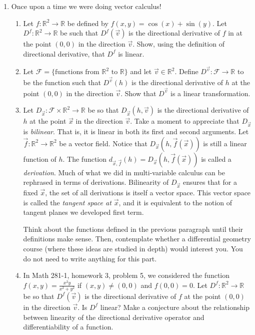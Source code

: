 \documentclass[letter]{article}
\newcommand{\R}{\mathbb{R}}
\begin{document}
\begin{enumerate}
		\item {\sc Once upon a time we were doing vector calculus!}
			\begin{enumerate}
				\item Let $f:\R^2\to \R$ be defined by $f(x,y) = \cos(x)+\sin(y)$.  Let $D^f:\R^2\to\R$
					be such that $D^f(\vec v)$ is the directional derivative of $f$ in at the point $(0,0)$
					in the direction $\vec v$.  Show, using the definition of directional derivative, that
					$D^f$ is linear.
				\item Let $\mathcal F=\{\text{functions from $\R^2$ to $\R$}\}$ and let $\vec v\in \R^2$.
					Define $D^{\vec v}:\mathcal F\to \R$ to be the function such that $D^{\vec v}(h)$
					is the directional derivative of $h$ at the point $(0,0)$ in the direction $\vec v$.
					Show that $D^{\vec v}$ is a linear transformation.
				\item Let $D_{\vec x}:\mathcal F\times \R^2\to\R$ be so that $D_{\vec x}(h,\vec v)$ is the directional
					derivative of $h$ at the point $\vec x$ in the direction $\vec v$.
					Take a moment to appreciate that $D_{\vec x}$ is \emph{bilinear}.  That is, it is
					linear in both its first and second arguments.  Let $\vec f:\R^2\to\R^2$ be a 
					vector field.  Notice that $D_{\vec x}(h,\vec f(\vec x))$ is still a linear function of
					$h$.  The function $d_{\vec x,\vec f}(h)=D_{\vec x}(h, \vec f(\vec x))$ is called
					a \emph{derivation}.  Much of what we did in multi-variable calculus can be rephrased
					in terms of derivations.    Bilinearity of $D_{\vec x}$
					ensures that for a fixed $\vec x$, the set of all derivations is itself a vector space.
					This vector space is called the \emph{tangent space at $\vec x$}, and it is equivalent
					to the notion of tangent planes we developed first term.

					Think about the functions defined in the previous paragraph until their definitions
					make sense.  Then, contemplate whether a differential geometry course (where these
					ideas are studied in depth) would interest you.  You do not need to write anything for this part.
				\item In Math 281-1, homework 3, problem 5, we considered the function $f(x,y)=\frac{x^2y}{x^2+y^2}$
					if $(x,y)\neq(0,0)$ and $f(0,0)=0$.  Let $D^f:\R^2\to \R$ be so that $D^f(\vec v)$
					is the directional derivative
					of $f$ at the point $(0,0)$ in the direction $\vec v$.  Is $D^f$ linear?  Make a conjecture
					about the relationship between linearity of the directional derivative operator
					and differentiability of a function.
			\end{enumerate}

	\end{enumerate}
\end{document}
